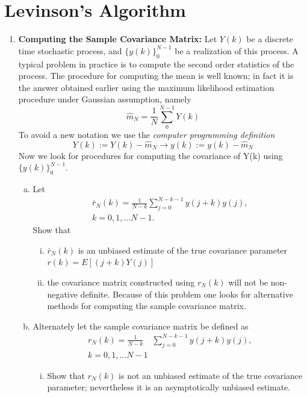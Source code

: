 \documentclass[journal,12pt,twocolumn]{IEEEtran}
\begin{document}
\section{Levinson's Algorithm}
\begin{enumerate}[1.]
\item\textbf{Computing the Sample Covariance Matrix:}
Let $Y(k)$ be a discrete time stochastic process, and $\{y(k)\}_0^{N-1}$ be a realization of this process.
A typical problem in practice is to compute the second order statistics of the process.
The procedure for computing the mean is well known; in fact it is the answer obtained earlier
using the maximum likelihood estimation procedure under Gaussian assumption, namely
\begin{equation}
\hat{m}_N=\frac{1}{N}\sum_0^{N-1}Y(k)
\end{equation}
%
To avoid a new notation we use the \textit{computer programming definition}
\begin{equation}
Y(k):=Y(k)-\hat{m}_N\rightarrow y(k):=y(k)-\hat{m}_N
\end{equation}
Now we look for procedures for computing the covariance of Y(k) using $\{y(k)\}_0^{N-1}.$
\begin{enumerate}[(a)]
\item Let
\begin{multline}
\bar{r}_N{(k)}=\frac{1}{N-k}{\sum_{j=0}^{N-k-1}}{y(j+k)}y(j),
\\
 k=0,1,...N-1. 
\end{multline}
%
Show that
\begin{enumerate}[i.]
\item $\bar{r}_N{(k)}$ is an unbiased estimate of the true covariance parameter $r(k)=E[(j+k)Y(j)]$
\item the covariance matrix constructed using $r_N{(k)}$ will not be non-negative definite. Because of this problem one looks for alternative methods for computing the sample
covariance matrix.
\end{enumerate}
\item Alternately let the sample covariance matrix be defined as
\begin{multline}
r_N{(k)}=\frac{1}{N-k}{\quad\sum_{j=0}^{N-k-1}}{y(j+k)}y(j),
\\
 k=0,1,...N-1 
\end{multline}
%
\begin{enumerate}[i.]
\item Show that $r_N{(k)}$ is not an unbiased estimate of the true covariance parameter; nevertheless it is an asymptotically unbiased estimate.

\end{enumerate}
\end{enumerate}
\end{enumerate}
\end{document}
